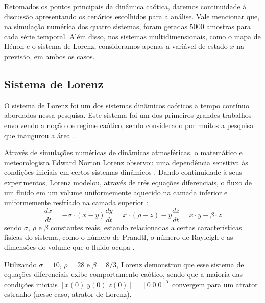 \documentclass[a4paper, 12pt]{article}
\begin{document}
Retomados os pontos principais da dinâmica caótica, daremos continuidade à discussão apresentando os cenários escolhidos para a análise. Vale mencionar que, na simulação numérica dos quatro sistemas, foram geradas $5000$ amostras para cada série temporal. Além disso, nos sistemas multidimensionais, como o mapa de Hénon e o sistema de Lorenz, consideramos apenas a variável de estado $x$ na previsão, em ambos os casos.

\subsection{Sistema de Lorenz}

O sistema de Lorenz foi um dos sistemas dinâmicos caóticos a tempo contínuo abordados nessa pesquisa. Este sistema foi um dos primeiros grandes trabalhos envolvendo a noção de regime caótico, sendo considerado por muitos a pesquisa que inaugurou a área \cite{gleick1998chaos}. 

Através de simulações numéricas de dinâmicas atmosféricas, o matemático e meteorologista Edward Norton Lorenz observou uma dependência sensitiva às condições iniciais em certos sistemas dinâmicos \cite{fiedler1994caos}. Dando continuidade à seus experimentos, Lorenz modelou, através de três equações diferenciais, o fluxo de um fluido em um volume uniformemente aquecido na camada inferior e uniformemente resfriado na camada superior \cite{lorenz1963deterministic}:
\begin{subequations}
\begin{equation}
\frac{dx}{dt} = -\sigma \cdot (x - y)
\end{equation}
\begin{equation}
\frac{dy}{dt} = x \cdot (\rho - z) - y
\end{equation}
\begin{equation}
\frac{dz}{dt} = x \cdot y - \beta \cdot z
\end{equation}
\end{subequations}
sendo $\sigma$, $\rho$ e $\beta$ constantes reais, estando relacionadas a certas características físicas do sistema, como o número de Prandtl, o número de Rayleigh e as dimensões do volume que o fluido ocupa \cite{fiedler1994caos}.

Utilizando $\sigma = 10$, $\rho = 28$ e $\beta = 8/3$, Lorenz demonstrou que esse sistema de equações diferenciais exibe comportamento caótico, sendo que a maioria das condições iniciais $[x(0)\; y(0)\; z(0)] = [0\; 0\; 0]^T$ convergem para um atrator estranho (nesse caso, atrator de Lorenz).
\end{document}
